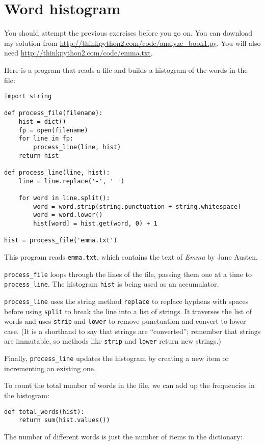 \documentclass[10pt]{book}
\begin{document}
\section{Word histogram}

You should attempt the previous exercises before you go on.
You can download my solution from
 \url{http://thinkpython2.com/code/analyze_book1.py}.  You will
also need \url{http://thinkpython2.com/code/emma.txt}.

Here is a program that reads a file and builds a histogram of the
words in the file:

\begin{verbatim}
import string

def process_file(filename):
    hist = dict()
    fp = open(filename)
    for line in fp:
        process_line(line, hist)
    return hist

def process_line(line, hist):
    line = line.replace('-', ' ')
    
    for word in line.split():
        word = word.strip(string.punctuation + string.whitespace)
        word = word.lower()
        hist[word] = hist.get(word, 0) + 1

hist = process_file('emma.txt')
\end{verbatim}
%
This program reads {\tt emma.txt}, which contains the text of {\em
  Emma} by Jane Austen.

\verb"process_file" loops through the lines of the file,
passing them one at a time to \verb"process_line".  The histogram
{\tt hist} is being used as an accumulator.

\verb"process_line" uses the string method {\tt replace} to replace
hyphens with spaces before using {\tt split} to break the line into a
list of strings.  It traverses the list of words and uses {\tt strip}
and {\tt lower} to remove punctuation and convert to lower case.  (It
is a shorthand to say that strings are ``converted''; remember that
strings are immutable, so methods like {\tt strip} and {\tt lower}
return new strings.)

Finally, \verb"process_line" updates the histogram by creating a new
item or incrementing an existing one.

To count the total number of words in the file, we can add up
the frequencies in the histogram:

\begin{verbatim}
def total_words(hist):
    return sum(hist.values())
\end{verbatim}
%
The number of different words is just the number of items in
the dictionary:
\end{document}
